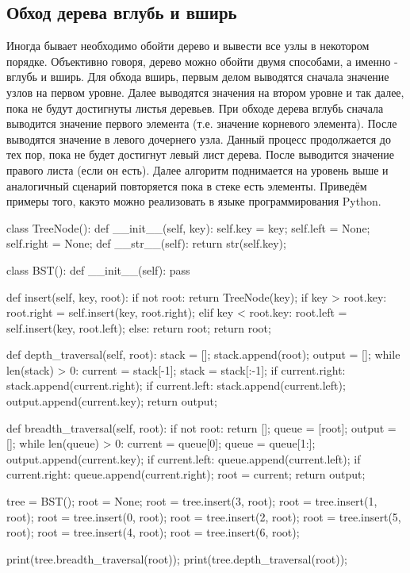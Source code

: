 \subsection{Обход дерева вглубь и вширь}

Иногда бывает необходимо обойти дерево и вывести все узлы в некотором порядке.
Объективно говоря, дерево можно обойти двумя способами, а именно - вглубь и вширь.
Для обхода вширь, первым делом выводятся сначала значение узлов на первом уровне.
Далее выводятся значения на втором уровне и так далее, пока не будут достигнуты
листья деревьев. При обходе дерева вглубь сначала выводится значение первого элемента (т.е. значение 
корневого элемента). После выводятся значение в левого дочернего узла. 
Данный процесс продолжается до тех пор, пока не будет достигнут левый лист дерева. 
После выводится значение правого листа (если он есть). Далее алгоритм 
поднимается на уровень выше и аналогичный сценарий повторяется пока в стеке 
есть элементы. Приведём примеры того, какэто можно реализовать в языке 
программирования Python.

\begin{python}
class TreeNode():
	def __init__(self, key):
		self.key = key;
		self.left = None;
		self.right = None;
	def __str__(self):
		return str(self.key);

class BST():
	def __init__(self):
		pass

	def insert(self, key, root):
		if not root:
			return TreeNode(key);
		if key > root.key:
			root.right = self.insert(key, root.right);
		elif key < root.key:
			root.left = self.insert(key, root.left);
		else:
			return root;
		return root;

	def depth_traversal(self, root):
		stack = [];
		stack.append(root);
		output = [];
		while len(stack) > 0:
			current = stack[-1];
			stack = stack[:-1];
			if current.right:
				stack.append(current.right);
			if current.left:
				stack.append(current.left);
			output.append(current.key);
		return output;

	def breadth_traversal(self, root):
		if not root:
			return [];
		queue = [root];
		output = [];
		while len(queue) > 0:
			current = queue[0];
			queue = queue[1:];
			output.append(current.key);
			if current.left:
				queue.append(current.left);
			if current.right:
				queue.append(current.right);
			root = current;
		return output;

tree = BST();
root = None;
root = tree.insert(3, root);
root = tree.insert(1, root);
root = tree.insert(0, root);
root = tree.insert(2, root);
root = tree.insert(5, root);
root = tree.insert(4, root);
root = tree.insert(6, root);

print(tree.breadth_traversal(root));
print(tree.depth_traversal(root));
\end{python}

